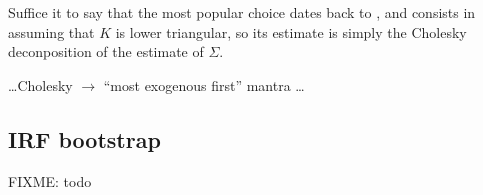 Suffice it to say that the most popular choice dates back to
\cite{sims80}, and consists in assuming that $K$ is lower triangular,
so its estimate is simply the Cholesky deconposition of the estimate of
$\Sigma$.

 \ldots Cholesky $\to$ ``most exogenous first'' mantra
\ldots

\subsection{IRF bootstrap}

FIXME: todo 


